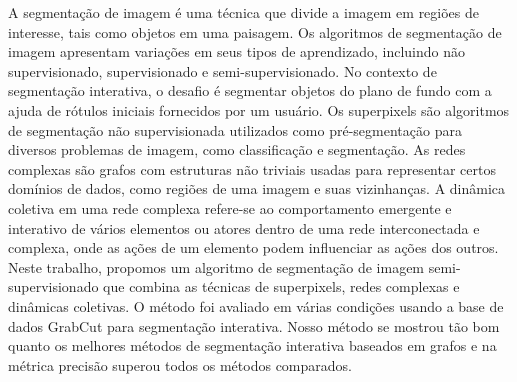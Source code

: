 A segmentação de imagem é uma técnica que divide a imagem em regiões
de interesse, tais como objetos em uma paisagem. Os algoritmos de
segmentação de imagem apresentam variações em seus tipos de
aprendizado, incluindo não supervisionado, supervisionado e
semi-supervisionado. No contexto de segmentação interativa, o desafio
é segmentar objetos do plano de fundo com a ajuda de rótulos iniciais
fornecidos por um usuário. Os superpixels são algoritmos de
segmentação não supervisionada utilizados como pré-segmentação para
diversos problemas de imagem, como classificação e segmentação. As
redes complexas são grafos com estruturas não triviais usadas para
representar certos domínios de dados, como regiões de uma imagem e
suas vizinhanças. A dinâmica coletiva em uma rede complexa refere-se
ao comportamento emergente e interativo de vários elementos ou atores
dentro de uma rede interconectada e complexa, onde as ações de um
elemento podem influenciar as ações dos outros. Neste trabalho,
propomos um algoritmo de segmentação de imagem semi-supervisionado que
combina as técnicas de superpixels, redes complexas e dinâmicas
coletivas. O método foi avaliado em várias condições usando a base de
dados GrabCut para segmentação interativa. Nosso método se mostrou tão
bom quanto os melhores métodos de segmentação interativa baseados em
grafos e na métrica precisão superou todos os métodos comparados.


